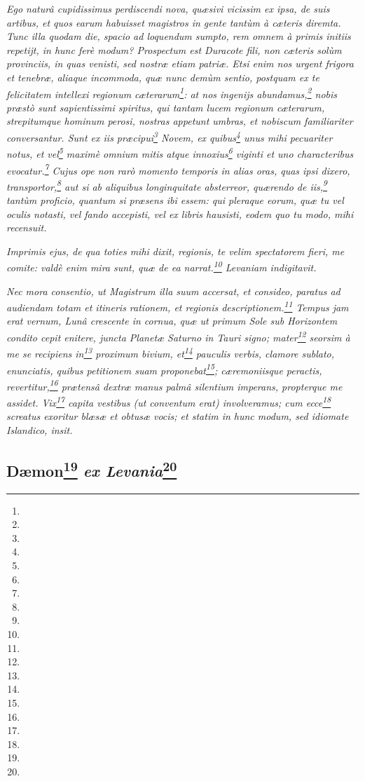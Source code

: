 \documentclass[a4paper, 11pt, oneside, polutonikogreek, german]{article}
\begin{document}
\emph{Ego naturâ cupidissimus perdiscendi nova, quæsivi vicissim ex ipsa, de suis artibus, et quos earum habuisset magistros in gente tantùm à cæteris diremta. Tunc illa quodam die, spacio ad loquendum sumpto, rem omnem à primis initiis repetijt, in hunc ferè modum? Prospectum est Duracote fili, non cæteris solùm provinciis, in quas venisti, sed nostræ etiam patriæ. Etsi enim nos urgent frigora et tenebræ, aliaque incommoda, quæ nunc demùm sentio, postquam ex te felicitatem intellexi regionum cæterarum\footnote{}: at nos ingenijs abundamus,\footnote{} nobis præstò sunt sapientissimi spiritus, qui tantam lucem regionum cæterarum, strepitumque hominum perosi, nostras appetunt umbras, et nobiscum familiariter conversantur. Sunt ex iis præcipui\footnote{} Novem, ex quibus\footnote{} unus mihi pecuariter notus, et vel\footnote{} maximè omnium mitis atque innoxius\footnote{} viginti et uno characteribus evocatur.\footnote{} Cujus ope non rarò momento temporis in alias oras, quas ipsi dixero, transportor,\footnote{} aut si ab aliquibus longinquitate absterreor, quærendo de iis,\footnote{} tantùm proficio, quantum si præsens ibi essem: qui pleraque eorum, quæ tu vel oculis notasti, vel fando accepisti, vel ex libris hausisti, eodem quo tu modo, mihi recensuit.}

\emph{Imprimis ejus, de qua toties mihi dixit, regionis, te velim spectatorem fieri, me comite: valdè enim mira sunt, quæ de ea narrat.\footnote{} Levaniam indigitavit.}

\emph{Nec mora consentio, ut Magistrum illa suum accersat, et consideo, paratus ad audiendam totam et itineris rationem, et regionis descriptionem.\footnote{} Tempus jam erat vernum, Lunâ crescente in cornua, quæ ut primum Sole sub Horizontem condito cepit enitere, juncta Planetæ Saturno in Tauri signo; mater\footnote{} seorsim à me se recipiens in\footnote{} proximum bivium, et\footnote{} pauculis verbis, clamore sublato, enunciatis, quibus petitionem suam proponebat\footnote{}; cæremoniisque peractis, revertitur,\footnote{} prætensâ dextræ manus palmâ silentium imperans, propterque me assidet. Vix\footnote{} capita vestibus (ut conventum erat) involveramus; cum ecce\footnote{} screatus exoritur blæsæ et obtusæ vocis; et statim in hunc modum, sed idiomate Islandico, insit.}

\subsection[Dæmon \emph{ex Levania}]{Dæmon\footnote{} \emph{ex Levania}\footnote{}}
\end{document}
